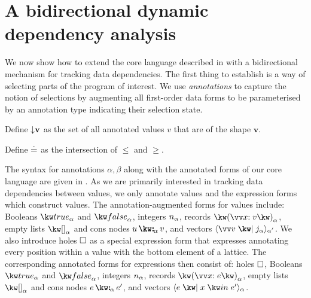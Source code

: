 \section{A bidirectional dynamic dependency analysis}
\label{sec:data-dependencies}

We now show how to extend the core language described in  with a bidirectional mechanism for tracking data dependencies. The first thing to establish is a way of selecting parts of the program of interest. We use \textit{annotations} to capture the notion of selections by augmenting all first-order data forms to be parameterised by an annotation type indicating their selection state.





\begin{definition}[?]
   Define ${\downarrow}{\textbf{v}}$ as the set of all annotated values $v$ that are of the shape $\textbf{v}$.
\end{definition}

\begin{definition}
   Define $\doteq$ as the intersection of $\leq$ and $\geq$.
\end{definition}




\noindent
The syntax for annotations $\alpha, \beta$ along with the annotated forms of our core language are given in . As we are primarily interested in tracking data dependencies between values, we only annotate values and the expression forms which construct values. The annotation-augmented forms for values include: Booleans $\annTrue{\alpha}$ and $\annFalse{\alpha}$, integers $n_{\alpha}$, records $\annRec{\vec{\bind{x}{v}}}{\alpha}$, empty lists $\annNil{\alpha}$ and cons nodes $\annCons{u}{v}{\alpha}$, and vectors $\annVecVal{\vec{v}}{\annInt{j}{\alpha}}{\smash{\alpha'}}$. We also introduce holes $\square$ as a special expression form that expresses annotating every position within a value with the bottom element of a lattice. The corresponding annotated forms for expressions then consist of: holes $\square$, Booleans $\annTrue{\alpha}$ and $\annFalse{\alpha}$, integers $n_{\alpha}$, records $\annRec{\vec{\bind{x}{e}}}{\alpha}$, empty lists $\annNil{\alpha}$ and cons nodes $\annCons{e}{e'}{\alpha}$, and vectors $\annVec{e}{x}{e'}{\alpha}$.

